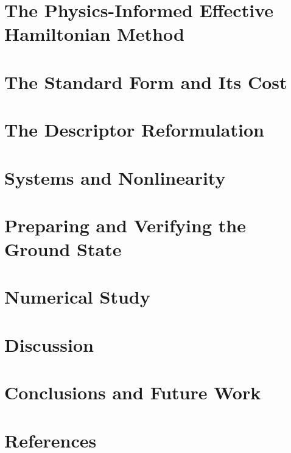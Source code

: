 \documentclass[12pt]{article}
\begin{document}
\section{The Physics-Informed Effective Hamiltonian Method}
\label{sec:pihm}


\section{The Standard Form and Its Cost}
\label{sec:standard}


\section{The Descriptor Reformulation}
\label{sec:descriptor}


\section{Systems and Nonlinearity}
\label{sec:extensions}


\section{Preparing and Verifying the Ground State}
\label{sec:pipeline}


\section{Numerical Study}
\label{sec:results}


\section{Discussion}
\label{sec:discussion}


\section{Conclusions and Future Work}
\label{sec:conclusions}


\newpage
\section{References}
\label{sec:ref}
\printbibliography[heading=none]
\end{document}
